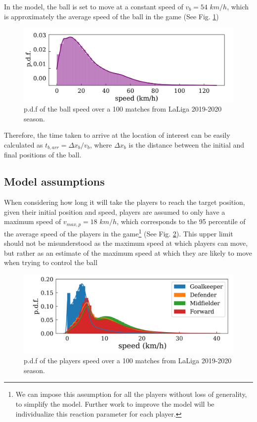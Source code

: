 \documentclass[
  10pt,
  twoside,nohyper]{book}
\begin{document}
In the model, the ball is set to move at a constant speed of \(v_b = 54\) \(km/h\), which is approximately the average speed of the ball in the game \autocite{Spearman} (See Fig. \ref{fig:ball})

\begin{figure}[H]

{\centering \includegraphics[width=0.8\linewidth,]{imagenes/ball} 

}

\caption{p.d.f of the ball speed over a 100 matches from LaLiga 2019-2020 season.}\label{fig:ball}
\end{figure}

Therefore, the time taken to arrive at the location of interest can be easily calculated as \(t_{b,arr} = \Delta x_b/v_b\), where \(\Delta x_b\) is the distance between the initial and final positions of the ball.

\subsection{Model assumptions}\label{model-assumptions}

When considering how long it will take the players to reach the target position, given their initial position and speed, players are assumed to only have a maximum speed of \(v_{max,p} = 18\) \(km/h\), which corresponds to the 95 percentile of the average speed of the players in the game\footnote{We can impose this assumption for all the players without loss of generality, to simplify the model. Further work to improve the model will be individualize this reaction parameter for each player.} \autocite{Spearman} (See Fig. \ref{fig:vel}). This upper limit should not be misunderstood as the maximum speed at which players can move, but rather as an estimate of the maximum speed at which they are likely to move when trying to control the ball

\begin{figure}[H]

{\centering \includegraphics[width=0.8\linewidth,]{imagenes/vel} 

}

\caption{p.d.f of the players speed over a 100 matches from LaLiga 2019-2020 season.}\label{fig:vel}
\end{figure}
\end{document}
